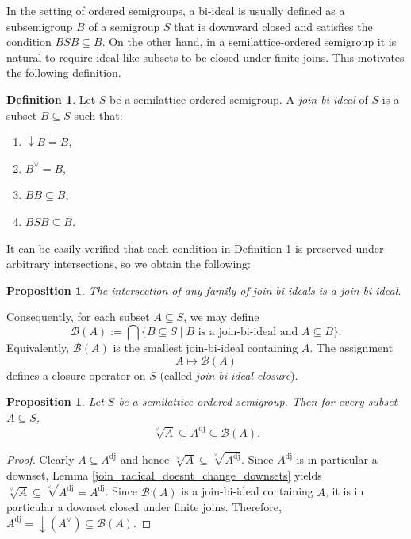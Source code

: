 \documentclass[10pt, reqno]{amsart}
\theoremstyle{plain}
\newtheorem{prop}[theorem]{Proposition}
\theoremstyle{definition}
\newtheorem{definition}[theorem]{Definition}
\begin{document}
In the setting of ordered semigroups, a bi-ideal is usually defined as a subsemigroup $B$ of a semigroup $S$ that is downward closed and satisfies the condition $BSB \subseteq B$. On the other hand, in a semilattice-ordered semigroup it is natural to require ideal-like subsets to be closed under finite joins. This motivates the following definition.  
\begin{definition}\label{definition_join_bi_ideal}
    Let $S$ be a semilattice-ordered semigroup. A \emph{join-bi-ideal} of $S$ is a subset $B \subseteq S$ such that: 
    \begin{enumerate}[label=(\arabic*)]
        \item $\downarrow B = B$, 
        \item $B^{\lor} = B$, 
        \item $BB \subseteq B$, 
        \item $BSB \subseteq B$. 
    \end{enumerate}
\end{definition}

It can be easily verified that each condition in Definition \ref{definition_join_bi_ideal} is preserved under arbitrary intersections, so we obtain the following: 
\begin{prop}
    The intersection of any family of join-bi-ideals is a join-bi-ideal. 
\end{prop}

\noindent Consequently, for each subset $A \subseteq S$, we may define
\begin{equation*}
    \mathcal{B}(A) := \bigcap\{B \subseteq S \mid B \text { is a join-bi-ideal and } A \subseteq B\}. 
\end{equation*}
Equivalently, $\mathcal{B}(A)$ is the smallest join-bi-ideal containing $A$. The assignment $$A \mapsto \mathcal{B}(A)$$ defines a closure operator on $S$ (called \emph{join-bi-ideal closure}). 
\begin{prop}\label{join_radical_is_contained_in_bi_ideal}
    Let $S$ be a semilattice-ordered semigroup. Then for every subset $A \subseteq S$, $$\sqrt[\lor]{A} \subseteq A^\mathrm{dj} \subseteq \mathcal{B}(A).$$ 
\end{prop}
\begin{proof}
    Clearly $A \subseteq A^\mathrm{dj}$ and hence $\sqrt[\lor]{A} \subseteq \sqrt[\lor]{A^\mathrm{dj}}$. Since $A^\mathrm{dj}$ is in particular a downset, Lemma \ref{join_radical_doesnt_change_downsets} yields $\sqrt[\lor]{A} \subseteq \sqrt[\lor]{A^\mathrm{dj}} = A^\mathrm{dj}$. Since $\mathcal{B}(A)$ is a join-bi-ideal containing $A$, it is in particular a downset closed under finite joins. Therefore, $A^\mathrm{dj} = \downarrow(A^\lor) \subseteq \mathcal{B}(A).$
\end{proof}
\end{document}
